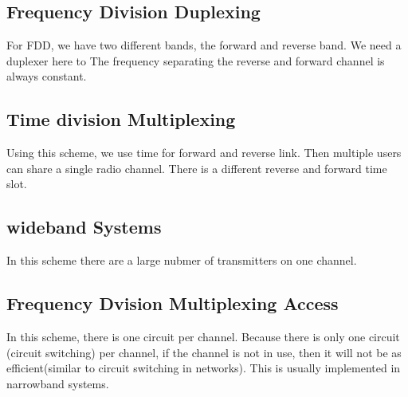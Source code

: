 \documentclass{article}
\begin{document}
\subsection{Frequency Division Duplexing}
For FDD, we have two different bands, the forward and reverse band. We need a duplexer here to The 
frequency separating the reverse and forward channel is always constant.
\subsection{Time division Multiplexing}
Using this scheme, we use time for forward and reverse link. Then multiple users can share a single
radio channel. There is a different reverse and forward time slot.

\subsection{wideband Systems}
In this scheme there are a large nubmer of transmitters on one channel. 
\subsection{Frequency Dvision Multiplexing Access}
In this scheme, there is one circuit per channel. Because there is only one circuit (circuit switching)
per channel, if the channel is not in use, then it will not be as efficient(similar to circuit switching
in networks). This is usually implemented in narrowband systems.
\end{document}
